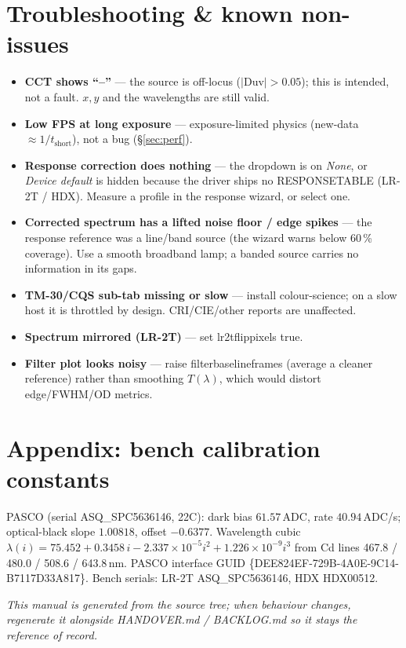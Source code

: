\documentclass[12pt,a4paper]{article}
\DeclareRobustCommand{\code}[1]{{\ttfamily\small\def\_{\rawus\allowbreak}#1}}
\DeclareRobustCommand{\key}[1]{{\ttfamily\small\color{acc2}\def\_{\rawus\allowbreak}#1}}
\newcommand{\nm}{\,nm}
\begin{document}
\section{Troubleshooting \& known non-issues}
\begin{itemize}
  \item \textbf{CCT shows ``--''} --- the source is off-locus ($|$Duv$|>0.05$);
        this is intended, not a fault. $x,y$ and the wavelengths are still valid.
  \item \textbf{Low FPS at long exposure} --- exposure-limited physics
        (new-data $\approx 1/t_{\text{short}}$), not a bug (\S\ref{sec:perf}).
  \item \textbf{Response correction does nothing} --- the dropdown is on
        \emph{None}, or \emph{Device default} is hidden because the driver ships no
        \code{RESPONSE\_TABLE} (LR-2T / HDX). Measure a profile in the response
        wizard, or select one.
  \item \textbf{Corrected spectrum has a lifted noise floor / edge spikes} --- the
        response reference was a line/band source (the wizard warns below 60\,\%
        coverage). Use a smooth broadband lamp; a banded source carries no
        information in its gaps.
  \item \textbf{TM-30/CQS sub-tab missing or slow} --- install colour-science; on a
        slow host it is throttled by design. CRI/CIE/other reports are unaffected.
  \item \textbf{Spectrum mirrored (LR-2T)} --- set \key{lr2t\_flip\_pixels} true.
  \item \textbf{Filter plot looks noisy} --- raise \key{filter\_baseline\_frames}
        (average a cleaner reference) rather than smoothing $T(\lambda)$, which would
        distort edge/FWHM/OD metrics.
\end{itemize}

\appendix
\section{Appendix: bench calibration constants}
PASCO (serial ASQ\_SPC5636146, 22\textdegree C): dark bias $61.57\,$ADC, rate
$40.94\,$ADC/s; optical-black slope $1.00818$, offset $-0.6377$. Wavelength cubic
$\lambda(i)=75.452+0.3458\,i-2.337\times10^{-5}i^2+1.226\times10^{-9}i^3$ from Cd
lines 467.8 / 480.0 / 508.6 / 643.8\nm. PASCO interface GUID
\code{\{DEE824EF-729B-4A0E-9C14-B7117D33A817\}}. Bench serials: LR-2T
ASQ\_SPC5636146, HDX HDX00512.

\vspace{1cm}
\begin{center}\small\itshape
This manual is generated from the source tree; when behaviour changes, regenerate
it alongside HANDOVER.md / BACKLOG.md so it stays the reference of record.
\end{center}
\end{document}
